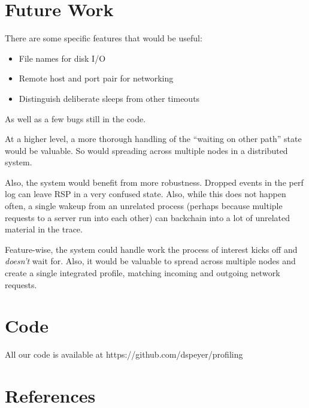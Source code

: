 \documentclass[10pt]{article}
\begin{document}
\section{Future Work}

There are some specific features that would be useful:

\begin{itemize}
\item File names for disk I/O
\item Remote host and port pair for networking
\item Distinguish deliberate sleeps from other timeouts
\end{itemize}

As well as a few bugs still in the code.

At a higher level, a more thorough handling of the ``waiting on other path'' state would be valuable.  So would spreading across multiple nodes in a distributed system.

Also, the system would benefit from more robustness.  Dropped events in the perf log can leave RSP in a very confused state.  Also, while this does not happen often, a single wakeup from an unrelated process (perhaps because multiple requests to a server run into each other) can backchain into a lot of unrelated material in the trace.

Feature-wise, the system could handle work the process of interest kicks off and \emph{doesn't} wait for.  Also, it would be valuable to spread across multiple nodes and create a single integrated profile, matching incoming and outgoing network requests.

\onecolumn

\section{Code}

All our code is available at https://github.com/dspeyer/profiling

\section{References}
\end{document}
